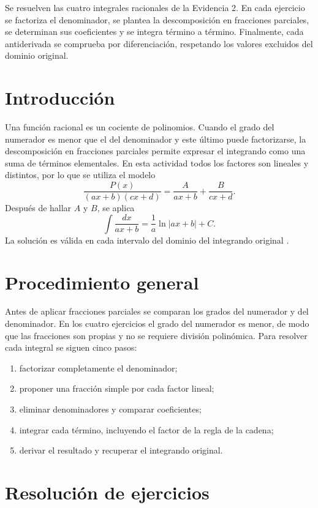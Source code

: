\begin{abstractd}
Se resuelven las cuatro integrales racionales de la Evidencia 2. En cada ejercicio se factoriza el denominador, se plantea la descomposición en fracciones parciales, se determinan sus coeficientes y se integra término a término. Finalmente, cada antiderivada se comprueba por diferenciación, respetando los valores excluidos del dominio original.
\end{abstractd}

\templateIndex

\section{Introducción}
Una función racional es un cociente de polinomios. Cuando el grado del numerador es menor que el del denominador y este último puede factorizarse, la descomposición en fracciones parciales permite expresar el integrando como una suma de términos elementales. En esta actividad todos los factores son lineales y distintos, por lo que se utiliza el modelo
\[
 \frac{P(x)}{(a x+b)(c x+d)}
 =\frac{A}{a x+b}+\frac{B}{c x+d}.
\]
Después de hallar $A$ y $B$, se aplica
\[
 \int\frac{dx}{a x+b}=\frac1a\ln|a x+b|+C.
\]
La solución es válida en cada intervalo del dominio del integrando original \citep{stewart2016calculus,openstax2016calculus1}.

\section{Procedimiento general}
Antes de aplicar fracciones parciales se comparan los grados del numerador y del denominador. En los cuatro ejercicios el grado del numerador es menor, de modo que las fracciones son propias y no se requiere división polinómica. Para resolver cada integral se siguen cinco pasos:
\begin{enumerate}
\item factorizar completamente el denominador;
\item proponer una fracción simple por cada factor lineal;
\item eliminar denominadores y comparar coeficientes;
\item integrar cada término, incluyendo el factor de la regla de la cadena;
\item derivar el resultado y recuperar el integrando original.
\end{enumerate}

\section{Resolución de ejercicios}

